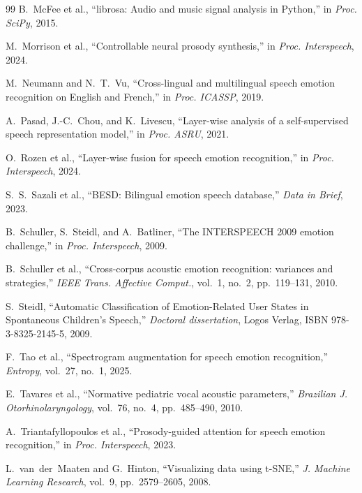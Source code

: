 \documentclass[11pt,a4paper]{article}
\begin{document}
\begin{thebibliography}{99}
B.~McFee et al.,
``{librosa}: Audio and music signal analysis in {P}ython,''
in \textit{Proc. SciPy}, 2015.

M.~Morrison et al.,
``{C}ontrollable neural prosody synthesis,''
in \textit{Proc. Interspeech}, 2024.

M.~Neumann and N.~T.~Vu,
``{C}ross-lingual and multilingual speech emotion recognition on {E}nglish and {F}rench,''
in \textit{Proc. ICASSP}, 2019.

A.~Pasad, J.-C.~Chou, and K.~Livescu,
``{L}ayer-wise analysis of a self-supervised speech representation model,''
in \textit{Proc. ASRU}, 2021.

O.~Rozen et al.,
``{L}ayer-wise fusion for speech emotion recognition,''
in \textit{Proc. Interspeech}, 2024.

S.~S.~Sazali et al.,
``{BESD}: {B}ilingual emotion speech database,''
\textit{Data in Brief}, 2023.

B.~Schuller, S.~Steidl, and A.~Batliner,
``{T}he {INTERSPEECH} 2009 emotion challenge,''
in \textit{Proc. Interspeech}, 2009.

B.~Schuller et al.,
``{C}ross-corpus acoustic emotion recognition: variances and strategies,''
\textit{IEEE Trans. Affective Comput.}, vol.~1, no.~2, pp.~119--131, 2010.

S.~Steidl,
``{A}utomatic {C}lassification of {E}motion-{R}elated {U}ser {S}tates in {S}pontaneous {C}hildren's {S}peech,''
\textit{Doctoral dissertation}, Logos Verlag, ISBN 978-3-8325-2145-5, 2009.

F.~Tao et al.,
``{S}pectrogram augmentation for speech emotion recognition,''
\textit{Entropy}, vol.~27, no.~1, 2025.

E.~Tavares et al.,
``{N}ormative pediatric vocal acoustic parameters,''
\textit{Brazilian J. Otorhinolaryngology}, vol.~76, no.~4, pp.~485--490, 2010.

A.~Triantafyllopoulos et al.,
``{P}rosody-guided attention for speech emotion recognition,''
in \textit{Proc. Interspeech}, 2023.

L.~van~der~Maaten and G.~Hinton,
``{V}isualizing data using {t-SNE},''
\textit{J. Machine Learning Research}, vol.~9, pp.~2579--2605, 2008.


\end{thebibliography}
\end{document}

